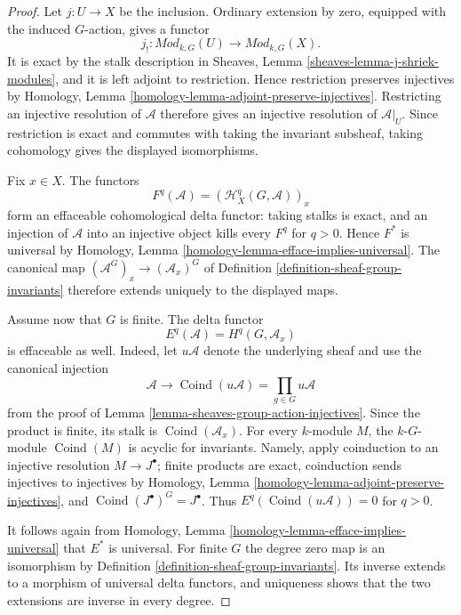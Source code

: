\begin{proof}
Let $j : U \to X$ be the inclusion. Ordinary extension by zero, equipped
with the induced $G$-action, gives a functor
$$
j_! : \textit{Mod}_{k, G}(U) \longrightarrow
\textit{Mod}_{k, G}(X).
$$
It is exact by the stalk description in Sheaves, Lemma
\ref{sheaves-lemma-j-shriek-modules}, and it is left adjoint to
restriction. Hence restriction preserves injectives by Homology, Lemma
\ref{homology-lemma-adjoint-preserve-injectives}. Restricting an injective
resolution of $\mathcal{A}$ therefore gives an injective resolution of
$\mathcal{A}|_U$. Since restriction is exact and commutes with taking the
invariant subsheaf, taking cohomology gives the displayed isomorphisms.

Fix $x \in X$. The functors
$$
F^q(\mathcal{A}) = (\mathcal{H}^q_X(G, \mathcal{A}))_x
$$
form an effaceable cohomological delta functor: taking stalks is exact,
and an injection of $\mathcal{A}$ into an injective object kills every
$F^q$ for $q > 0$. Hence $F^*$ is universal by Homology, Lemma
\ref{homology-lemma-efface-implies-universal}. The canonical map
$(\mathcal{A}^G)_x \to (\mathcal{A}_x)^G$ of Definition
\ref{definition-sheaf-group-invariants} therefore extends uniquely to the
displayed maps.

Assume now that $G$ is finite. The delta functor
$$
E^q(\mathcal{A}) = H^q(G, \mathcal{A}_x)
$$
is effaceable as well. Indeed, let $u\mathcal{A}$ denote the underlying
sheaf and use the canonical injection
$$
\mathcal{A} \longrightarrow \operatorname{Coind}(u\mathcal{A})
= \prod_{g \in G}u\mathcal{A}
$$
from the proof of Lemma
\ref{lemma-sheaves-group-action-injectives}. Since the product is finite,
its stalk is $\operatorname{Coind}(\mathcal{A}_x)$. For every $k$-module
$M$, the $k\text{-}G$-module $\operatorname{Coind}(M)$ is acyclic for
invariants. Namely, apply coinduction to an injective resolution
$M \to J^\bullet$; finite products are exact, coinduction sends injectives
to injectives by Homology, Lemma
\ref{homology-lemma-adjoint-preserve-injectives}, and
$\operatorname{Coind}(J^\bullet)^G = J^\bullet$. Thus
$E^q(\operatorname{Coind}(u\mathcal{A})) = 0$ for $q > 0$.

It follows again from Homology, Lemma
\ref{homology-lemma-efface-implies-universal} that $E^*$ is universal.
For finite $G$ the degree zero map is an isomorphism by Definition
\ref{definition-sheaf-group-invariants}. Its inverse extends to a morphism
of universal delta functors, and uniqueness shows that the two extensions
are inverse in every degree.
\end{proof}

